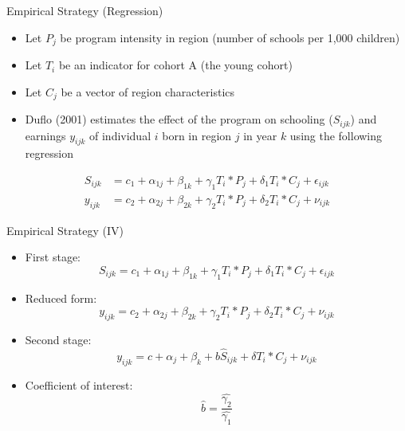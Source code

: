 \documentclass[11pt,notes=hide,aspectratio=169,mathserif]{beamer}
\begin{document}
\begin{frame}{Empirical Strategy (Regression)}
\begin{itemize}
     \item Let $P_j$ be program intensity in region (number of schools per 1,000 children)
     \item Let $T_i$ be an indicator for cohort A (the young cohort) 
     \item Let $C_j$ be a vector of region characteristics 
     \item Duflo (2001) estimates the effect of the program on schooling ($S_{ijk}$) and earnings $y_{ijk}$ of individual $i$ born in region $j$ in year $k$ using the following regression
\end{itemize}
 \begin{align*}
    S_{ijk} &= c_1 + \alpha_{1j} + \beta_{1k} + \gamma_1 T_i * P_j + \delta_1 T_i * C_j + \epsilon_{ijk} \\
    y_{ijk} &= c_2 + \alpha_{2j} + \beta_{2k} + \gamma_2 T_i * P_j + \delta_2 T_i * C_j + \nu_{ijk}
\end{align*}
\end{frame}

\begin{frame}{Empirical Strategy (IV)}
\begin{itemize}
    \item First stage: 
     \begin{equation}
        S_{ijk} = c_1 + \alpha_{1j} + \beta_{1k} + \gamma_1 T_i * P_j + \delta_1 T_i * C_j + \epsilon_{ijk}
    \end{equation}
     \item Reduced form: 
     \begin{equation}
        y_{ijk} = c_2 + \alpha_{2j} + \beta_{2k} + \gamma_2 T_i * P_j + \delta_2 T_i * C_j + \nu_{ijk}
    \end{equation}
     \item Second stage:
     \begin{equation}
        y_{ijk} = c + \alpha_{j} + \beta_{k} + b \hat{S}_{ijk} + \delta T_i * C_j + \nu_{ijk}
    \end{equation}
     \item Coefficient of interest:
     \begin{equation}
        \hat{b} = \frac{\hat{\gamma_2}}{\hat{\gamma_1}}
    \end{equation}
\end{itemize}
\end{frame}
\end{document}
